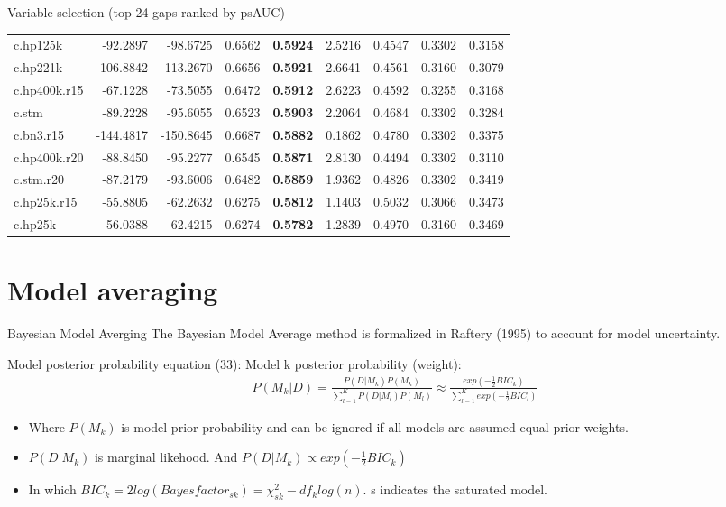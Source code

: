\documentclass[
  ignorenonframetext,
]{beamer}
\begin{document}
\begin{frame}{Variable selection (top 24 gaps ranked by psAUC)}
{\begin{tabular}[t]{lrrr>{}rrrrr}
c.hp125k & -92.2897 & -98.6725 & 0.6562 & \textbf{0.5924} & 2.5216 & 0.4547 & 0.3302 & 0.3158\\
c.hp221k & -106.8842 & -113.2670 & 0.6656 & \textbf{0.5921} & 2.6641 & 0.4561 & 0.3160 & 0.3079\\
c.hp400k.r15 & -67.1228 & -73.5055 & 0.6472 & \textbf{0.5912} & 2.6223 & 0.4592 & 0.3255 & 0.3168\\
c.stm & -89.2228 & -95.6055 & 0.6523 & \textbf{0.5903} & 2.2064 & 0.4684 & 0.3302 & 0.3284\\
\addlinespace
c.bn3.r15 & -144.4817 & -150.8645 & 0.6687 & \textbf{0.5882} & 0.1862 & 0.4780 & 0.3302 & 0.3375\\
c.hp400k.r20 & -88.8450 & -95.2277 & 0.6545 & \textbf{0.5871} & 2.8130 & 0.4494 & 0.3302 & 0.3110\\
c.stm.r20 & -87.2179 & -93.6006 & 0.6482 & \textbf{0.5859} & 1.9362 & 0.4826 & 0.3302 & 0.3419\\
c.hp25k.r15 & -55.8805 & -62.2632 & 0.6275 & \textbf{0.5812} & 1.1403 & 0.5032 & 0.3066 & 0.3473\\
c.hp25k & -56.0388 & -62.4215 & 0.6274 & \textbf{0.5782} & 1.2839 & 0.4970 & 0.3160 & 0.3469\\
\bottomrule
\end{tabular}}
\end{frame}

\hypertarget{model-averaging}{%
\section{Model averaging}\label{model-averaging}}

\begin{frame}{Bayesian Model Averging}
\protect\hypertarget{bayesian-model-averging}{}
The Bayesian Model Average method is formalized in Raftery (1995) to
account for model uncertainty.

\begin{block}{Model posterior probability}
\protect\hypertarget{model-posterior-probability}{}
equation (33): Model k posterior probability (weight): \begin{align}
  P(M_k|D) = \frac{P(D|M_k)P(M_k)}{\sum\nolimits_{l=1}^K P(D|M_l)P(M_l)} 
  \approx \frac{exp(-\frac{1}{2}BIC_k)}{\sum\nolimits_{l=1}^K exp(-\frac{1}{2}BIC_l)}
\end{align}

\begin{itemize}
\item
  Where \(P(M_k)\) is model prior probability and can be ignored if all
  models are assumed equal prior weights.
\item
  \(P(D|M_k)\) is marginal likehood. And
  \(P(D|M_k) \propto exp(-\frac{1}{2}BIC_k)\)
\item
  In which
  \(BIC_k = 2log (Bayesfactor_{sk}) = \chi^2_{sk} - df_klog(n)\). s
  indicates the saturated model.
\end{itemize}
\end{block}
\end{frame}
\end{document}
